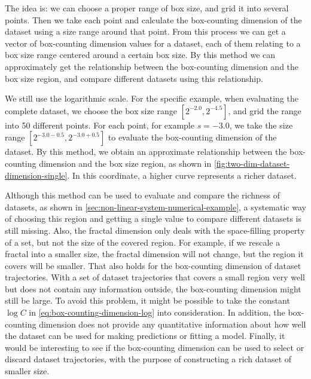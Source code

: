 The idea is: we can choose a proper range of box size, and grid it into several points.
Then we take each point and calculate the box-counting dimension of the dataset using a size range around that point.
From this process we can get a vector of box-counting dimension values for a dataset, each of them relating to a box size range centered around a certain box size.
By this method we can approximately get the relationship between the box-counting dimension and the box size region, and compare different datasets using this relationship.

We still use the logarithmic scale.
For the specific example, when evaluating the complete dataset, we choose the box size range $[2^{-2.0}, 2^{-4.5}]$, and grid the range into 50 different points.
For each point, for example $s = -3.0$, we take the size range $[2^{-3.0-0.5}, 2^{-3.0+0.5}]$ to evaluate the box-counting dimension of the dataset.
By this method, we obtain an approximate relationship between the box-counting dimension and the box size region, as shown in \cref{fig:two-dim-dataset-dimension-single}.
In this coordinate, a higher curve represents a richer dataset.


Although this method can be used to evaluate and compare the richness of datasets, as shown in \cref{sec:non-linear-system-numerical-example}, a systematic way of choosing this region and getting a single value to compare different datasets is still missing.
Also, the fractal dimension only deals with the space-filling property of a set, but not the size of the covered region.
For example, if we rescale a fractal into a smaller size, the fractal dimension will not change, but the region it covers will be smaller.
That also holds for the box-counting dimension of dataset trajectories.
With a set of dataset trajectories that covers a small region very well but does not contain any information outside, the box-counting dimension might still be large.
To avoid this problem, it might be possible to take the constant $\log C$ in \cref{eq:box-counting-dimension-log} into consideration.
In addition, the box-counting dimension does not provide any quantitative information about how well the dataset can be used for making predictions or fitting a model.
Finally, it would be interesting to see if the box-counting dimension can be used to select or discard dataset trajectories, with the purpose of constructing a rich dataset of smaller size.

